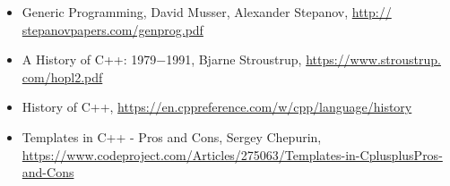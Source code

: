 \begin{itemize}
\item
Generic Programming, David Musser, Alexander Stepanov, \url{http:// stepanovpapers.com/genprog.pdf}

\item
A History of C++: 1979−1991, Bjarne Stroustrup, \url{https://www.stroustrup.
com/hopl2.pdf}

\item
History of C++, \url{https://en.cppreference.com/w/cpp/language/history}

\item
Templates in C++ - Pros and Cons, Sergey Chepurin, \url{https://www.codeproject.com/Articles/275063/Templates-in-CplusplusPros-and-Cons}
\end{itemize}